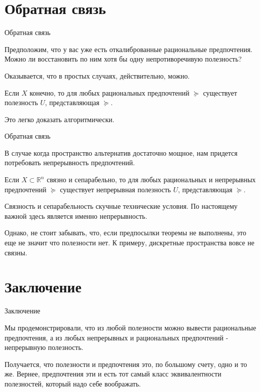 \documentclass{beamer}
\begin{document}
\section{Обратная связь}

\begin{frame}{Обратная связь}

Предположим, что у вас уже есть откалиброванные рациональные предпочтения. Можно ли восстановить по ним хотя бы одну непротиворечивую полезность? 

Оказывается, что в простых случаях, действительно, можно.

\begin{lemma}
Если $X$ конечно, то для любых рациональных предпочтений $\succcurlyeq$ существует полезность $U$, представляющая $\succcurlyeq$.
\end{lemma}

Это легко доказать алгоритмически.

\end{frame}

\begin{frame}{Обратная связь}

В случае когда пространство альтернатив достаточно мощное, нам придется потребовать непрерывность предпочтений. 

\begin{theorem}[Дебре]
Если $X\subset \mathbb{R}^n$ связно и сепарабельно, то для любых рациональных и непрерывных предпочтений $\succcurlyeq$ существует непрерывная полезность $U$, представляющая $\succcurlyeq$.
\end{theorem}

Связность и сепарабельность скучные технические условия. По настоящему важной здесь является именно непрерывность.

Однако, не стоит забывать, что, если предпосылки теоремы не выполнены, это еще не значит что полезности нет. К примеру, дискретные пространства вовсе не связны.

\end{frame}

\section{Заключение}

\begin{frame}{Заключение}

Мы продемонстрировали, что из любой полезности можно вывести рациональные предпочтения, а из любых непрерывных и рациональных предпочтений - непрерывную полезность.

Получается, что полезности и предпочтения это, по большому счету, одно и то же. Вернее, предпочтения эти и есть тот самый класс эквивалентности полезностей, который надо себе воображать.

\end{frame}
\end{document}
